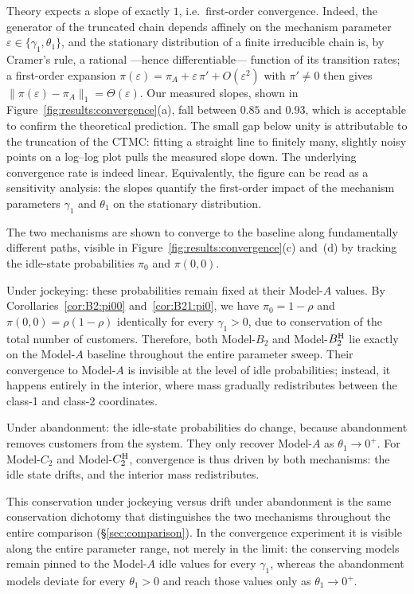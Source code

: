 Theory expects a slope of exactly $1$, i.e.\ first-order convergence. Indeed, the generator of the truncated chain depends affinely on the mechanism parameter $\varepsilon\in\{\gamma_1,\theta_1\}$, and the stationary distribution of a finite irreducible chain is, by Cramer's rule, a rational ---hence differentiable--- function of its transition rates; a first-order expansion $\pi(\varepsilon)=\pi_A+\varepsilon\,\pi'+O(\varepsilon^2)$ with $\pi'\neq0$ then gives $\lVert\pi(\varepsilon)-\pi_A\rVert_1=\Theta(\varepsilon)$. Our measured slopes, shown in Figure~\ref{fig:results:convergence}(a), fall between $0.85$ and $0.93$, which is acceptable to confirm the theoretical prediction. The small gap below unity is attributable to the truncation of the CTMC: fitting a straight line to finitely many, slightly noisy points on a log--log plot pulls the measured slope down. The underlying convergence rate is indeed linear. Equivalently, the figure can be read as a sensitivity analysis: the slopes quantify the first-order impact of the mechanism parameters $\gamma_1$ and $\theta_1$ on the stationary distribution.

The two mechanisms are shown to converge to the baseline along fundamentally different paths, visible in Figure~\ref{fig:results:convergence}(c) and~(d) by tracking the idle-state probabilities $\pi_0$ and $\pi(0,0)$.

Under jockeying: these probabilities remain fixed at their Model-$A$ values. By Corollaries~\ref{cor:B2:pi00} and~\ref{cor:B21:pi0}, we have $\pi_0 = 1-\rho$ and $\pi(0,0) = \rho(1-\rho)$ identically for every $\gamma_1>0$, due to conservation of the total number of customers. Therefore, both Model-$B_2$ and Model-$B_2^{\mathrm{H}}$ lie exactly on the Model-$A$ baseline throughout the entire parameter sweep. Their convergence to Model-$A$ is invisible at the level of idle probabilities; instead, it happens entirely in the interior, where mass gradually redistributes between the class-1 and class-2 coordinates.

Under abandonment: the idle-state probabilities do change, because abandonment removes customers from the system. They only recover Model-$A$ as $\theta_1\to0^+$. For Model-$C_2$ and Model-$C_2^{\mathrm{H}}$, convergence is thus driven by both mechanisms: the idle state drifts, and the interior mass redistributes.

This conservation under jockeying versus drift under abandonment is the same conservation dichotomy that distinguishes the two mechanisms throughout the entire comparison (\S\ref{sec:comparison}). In the convergence experiment it is visible along the entire parameter range, not merely in the limit: the conserving models remain pinned to the Model-$A$ idle values for every $\gamma_1$, whereas the abandonment models deviate for every $\theta_1>0$ and reach those values only as $\theta_1\to0^+$.

